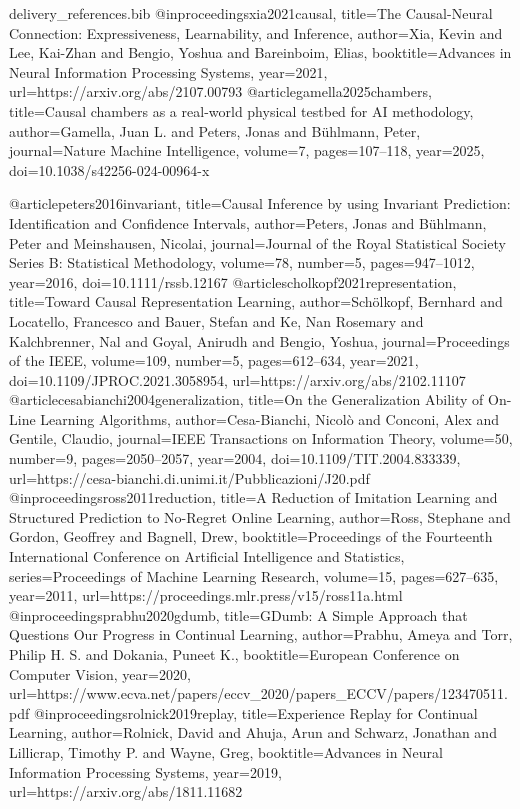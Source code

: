 \begin{filecontents*}[overwrite]{delivery_references.bib}
@inproceedings{xia2021causal,
  title={The Causal-Neural Connection: Expressiveness, Learnability, and Inference},
  author={Xia, Kevin and Lee, Kai-Zhan and Bengio, Yoshua and Bareinboim, Elias},
  booktitle={Advances in Neural Information Processing Systems},
  year={2021}, url={https://arxiv.org/abs/2107.00793}}
@article{gamella2025chambers,
  title={Causal chambers as a real-world physical testbed for AI methodology},
  author={Gamella, Juan L. and Peters, Jonas and B{\"u}hlmann, Peter},
  journal={Nature Machine Intelligence}, volume={7}, pages={107--118},
  year={2025}, doi={10.1038/s42256-024-00964-x}}

@article{peters2016invariant,
  title={Causal Inference by using Invariant Prediction: Identification and Confidence Intervals},
  author={Peters, Jonas and B{\"u}hlmann, Peter and Meinshausen, Nicolai},
  journal={Journal of the Royal Statistical Society Series B: Statistical Methodology},
  volume={78}, number={5}, pages={947--1012}, year={2016},
  doi={10.1111/rssb.12167}}
@article{scholkopf2021representation,
  title={Toward Causal Representation Learning},
  author={Sch{\"o}lkopf, Bernhard and Locatello, Francesco and Bauer, Stefan and Ke, Nan Rosemary and Kalchbrenner, Nal and Goyal, Anirudh and Bengio, Yoshua},
  journal={Proceedings of the IEEE}, volume={109}, number={5},
  pages={612--634}, year={2021}, doi={10.1109/JPROC.2021.3058954}, url={https://arxiv.org/abs/2102.11107}}
@article{cesabianchi2004generalization,
  title={On the Generalization Ability of On-Line Learning Algorithms},
  author={Cesa-Bianchi, Nicol{\`o} and Conconi, Alex and Gentile, Claudio},
  journal={IEEE Transactions on Information Theory}, volume={50}, number={9},
  pages={2050--2057}, year={2004}, doi={10.1109/TIT.2004.833339},
  url={https://cesa-bianchi.di.unimi.it/Pubblicazioni/J20.pdf}}
@inproceedings{ross2011reduction,
  title={A Reduction of Imitation Learning and Structured Prediction to No-Regret Online Learning},
  author={Ross, Stephane and Gordon, Geoffrey and Bagnell, Drew},
  booktitle={Proceedings of the Fourteenth International Conference on Artificial Intelligence and Statistics},
  series={Proceedings of Machine Learning Research}, volume={15},
  pages={627--635}, year={2011}, url={https://proceedings.mlr.press/v15/ross11a.html}}
@inproceedings{prabhu2020gdumb,
  title={{GDumb}: A Simple Approach that Questions Our Progress in Continual Learning},
  author={Prabhu, Ameya and Torr, Philip H. S. and Dokania, Puneet K.},
  booktitle={European Conference on Computer Vision}, year={2020},
  url={https://www.ecva.net/papers/eccv_2020/papers_ECCV/papers/123470511.pdf}}
@inproceedings{rolnick2019replay,
  title={Experience Replay for Continual Learning},
  author={Rolnick, David and Ahuja, Arun and Schwarz, Jonathan and Lillicrap, Timothy P. and Wayne, Greg},
  booktitle={Advances in Neural Information Processing Systems}, year={2019},
  url={https://arxiv.org/abs/1811.11682}}


\end{filecontents*}
